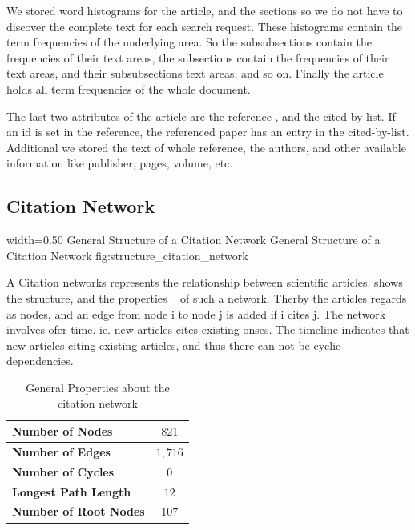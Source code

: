 We stored word histograms for the article, and the sections so we do not have to discover the complete text for each search request. These histograms contain the term frequencies of the underlying area. So the subsubsections contain the frequencies of their text areas, the subsections contain the frequencies of their text areas, and their subsubsections text areas, and so on. Finally the article holds all term frequencies of the whole document.

The last two attributes of the article are the reference-, and the cited-by-list. If an id is set in the reference, the referenced paper has an entry in the cited-by-list. Additional we stored the text of whole reference, the authors, and other available information like publisher, pages, volume, etc.

\subsection{Citation Network}
\label{sec:citation_network}

      {width=0.50\textwidth}
      {General Structure of a Citation Network}
      {General Structure of a Citation Network}
      {fig:structure_citation_network}

A Citation networks represents the relationship between scientific articles.  shows the structure, and the properties ~\cite{kas2011} of such a network. Therby the articles regards as nodes, and an edge from node i to node j is added if i cites j. The network involves ofer time. ie. new articles cites existing onses. The timeline indicates that new articles citing existing articles, and thus there can not be cyclic dependencies.

\begin{table}[b]
  \centering
  \begin{tabular}{ l c }
    \toprule
    \textbf{Number of Nodes}      & $821$  \\ \midrule
    \textbf{Number of Edges}      & $1,716$ \\ \midrule
    \textbf{Number of Cycles}     & $0$    \\ \midrule
    \textbf{Longest Path Length}  & $12$   \\ \midrule
    \textbf{Number of Root Nodes} & $107$  \\
    \bottomrule
  \end{tabular}
  \caption[General Properties about the citation network]{General Properties about the citation network}
  \label{tbl:general_properties_about_the_graph}
\end{table}

